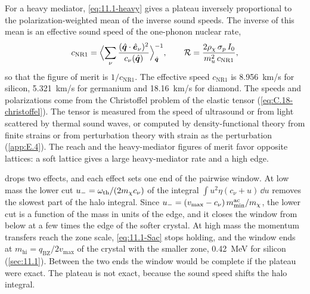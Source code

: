 For a heavy mediator, \cref{eq:11.1-heavy} gives a plateau inversely proportional to the polarization-weighted mean of the inverse sound speeds. The inverse of this mean is an effective sound speed of the one-phonon nuclear rate,
\begin{equation}
  c_{\mathrm{NR1}} = \Bigl\langle\sum_\nu\frac{(\hat{\bm{q}}\cdot\hat{\bm{e}}_\nu)^2}{c_\nu(\hat{\bm{q}})}\Bigr\rangle_{\hat{\bm{q}}}^{-1} ,
  \qquad
  \mathcal{R} = \frac{2\rho_\chi\,\sigma_p\,I_0}{m_u^2\,c_{\mathrm{NR1}}} ,
  \label{eq:17.5-cNR1}
\end{equation}
so that the figure of merit is $1/c_{\mathrm{NR1}}$. The effective speed $c_{\mathrm{NR1}}$ is \SI{8.956}{km/s} for silicon, \SI{5.321}{km/s} for germanium and \SI{18.16}{km/s} for diamond. The speeds and polarizations come from the Christoffel problem of the elastic tensor (\cref{eq:C.18-christoffel}). The tensor is measured from the speed of ultrasound or from light scattered by thermal sound waves, or computed by density-functional theory from finite strains or from perturbation theory with strain as the perturbation (\cref{app:E.4}). The reach and the heavy-mediator figures of merit favor opposite lattices: a soft lattice gives a large heavy-mediator rate and a high edge.

 drops two effects, and each effect sets one end of the pairwise window. At low mass the lower cut $u_- = \omega_{\mathrm{th}}/(2m_{\chi} c_\nu)$ of the integral $\int u^2\eta(c_\nu + u)\,\dd u$ removes the slowest part of the halo integral. Since $u_- = (v_{\mathrm{max}} - c_\nu)\,m_{\mathrm{min}}^{\mathrm{ac}}/m_{\chi}$, the lower cut is a function of the mass in units of the edge, and it closes the window from below at a few times the edge of the softer crystal. At high mass the momentum transfers reach the zone scale, \cref{eq:11.1-Sac} stops holding, and the window ends at $m_{\mathrm{hi}} = q_{\mathrm{BZ}}/2v_{\mathrm{max}}$ of the crystal with the smaller zone, \SI{0.42}{MeV} for silicon (\cref{sec:11.1}). Between the two ends the window would be complete if the plateau were exact. The plateau is not exact, because the sound speed shifts the halo integral.

